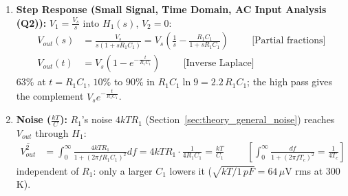 \begin{enumerate}
    \paragraph{At Output:} (looking in from \(V_{out}\) with both sources
    shorted, \(R_1\) and \(C_1\) are in parallel)
      \begin{align*}
        Z_{out} &= R_1 \parallel \frac{1}{sC_1} \\
        Z_{out} &= \frac{R_1 \cdot \frac{1}{sC_1}}{R_1 + \frac{1}{sC_1}} \\
        Z_{out} &= \frac{\frac{R_1}{sC_1}}{\frac{sC_1 R_1 + 1}{sC_1}} \\
        Z_{out} &= \frac{R_1}{sC_1 R_1 + 1} \\
        Z_{out} &= \frac{R_1}{1 + j \omega R_1 C_1} \hspace{1cm} \text{(Substituting \(s = j \omega\))} \\
        Z_{out} &= \frac{R_1}{1 + j \omega R_1 C_1} \cdot \frac{1 - j \omega R_1 C_1}{1 - j \omega R_1 C_1} \\
        Z_{out} &= \frac{R_1 (1 - j \omega R_1 C_1)}{1 - (j \omega R_1 C_1)^2} \\
        Z_{out} &= \frac{R_1 - j \omega R_1^2 C_1}{1 + (\omega R_1 C_1)^2} \hspace{1cm} \text{(\(j^2 = -1\))} \\
        Z_{out} &= \frac{R_1}{1 + (\omega R_1 C_1)^2} - j \frac{\omega R_1^2 C_1}{1 + (\omega R_1 C_1)^2}
      \end{align*}
  \item \textbf{Step Response (Small Signal, Time Domain, AC Input Analysis (Q2)):}
    \(V_1 = \frac{V_s}{s}\) into \(H_1(s)\), \(V_2 = 0\):
    \begin{align*}
      V_{out}(s) &= \frac{V_s}{s(1 + sR_1C_1)} = V_s\left(\frac{1}{s} - \frac{R_1C_1}{1 + sR_1C_1}\right) \hspace{1cm} \text{[Partial fractions]} \\
      V_{out}(t) &= V_s\left(1 - e^{-\frac{t}{R_1C_1}}\right) \hspace{1cm} \text{[Inverse Laplace]}
    \end{align*}
    \(63\%\) at \(t = R_1C_1\), \(10\%\) to \(90\%\) in \(R_1C_1\ln 9 = 2.2\,R_1C_1\); the high pass gives the complement
    \(V_s e^{-\frac{t}{R_1C_1}}\).
  \item \textbf{Noise (\(\frac{kT}{C}\)):} \(R_1\)'s noise \(4kTR_1\) (Section~\ref{sec:theory_general_noise}) reaches \(V_{out}\) through \(H_1\):
    \begin{align*}
      \overline{V_{out}^2} &= \int_0^\infty \frac{4kTR_1}{1 + (2\pi fR_1C_1)^2}df = 4kTR_1\cdot\frac{1}{4R_1C_1} = \frac{kT}{C_1} \hspace{1cm} \left[\int_0^\infty \frac{df}{1 + (2\pi fT_c)^2} = \frac{1}{4T_c}\right]
    \end{align*}
    independent of \(R_1\): only a larger \(C_1\) lowers it (\(\sqrt{kT/1\,pF} = 64\,\mu\)V rms at \(300\,\)K).
\end{enumerate}

